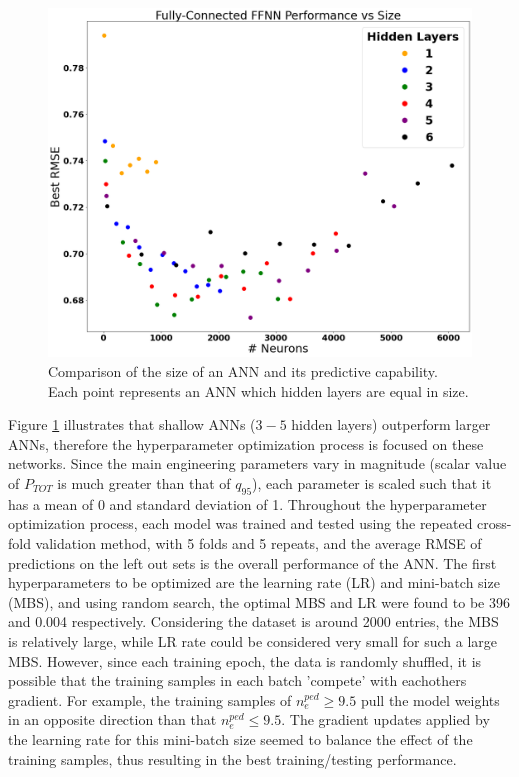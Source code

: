\documentclass[a4paper, twoside, final, 12pt]{article}
\begin{document}
{\begin{figure}
	\centering
	\includegraphics[scale=0.2]{./src/ANN_performace_size}
	\caption{Comparison of the size of an ANN and its predictive capability. Each point represents an ANN which hidden layers are equal in size.}
	\label{fig:ANN_dim}
\end{figure}
Figure \ref{fig:ANN_dim} illustrates that shallow ANNs ($3-5$ hidden layers) outperform larger ANNs, therefore the hyperparameter optimization process is focused on these networks. Since the main engineering parameters vary in magnitude (scalar value of $P_{TOT}$ is much greater than that of $q_{95}$), each parameter is scaled such that it has a mean of 0 and standard deviation of 1. Throughout the hyperparameter optimization process, each model was trained and tested using the repeated cross-fold validation method, with 5 folds and 5 repeats, and the average RMSE of predictions on the left out sets is the overall performance of the ANN. The first hyperparameters to be optimized are the learning rate (LR) and mini-batch size (MBS), and using random search, the optimal MBS and LR were found to be 396 and 0.004 respectively. Considering the dataset is around 2000 entries, the MBS is relatively large, while LR rate could be considered very small for such a large MBS. However, since each training epoch, the data is randomly shuffled, it is possible that the training samples in each batch 'compete' with eachothers gradient. For example, the training samples of $n_e^{ped} \geq 9.5$ pull the model weights in an opposite direction than that $n_e^{ped} \leq 9.5$. The gradient updates applied by the learning rate for this mini-batch size seemed to balance the effect of the training samples, thus resulting in the best training/testing performance. 

}
\end{document}
